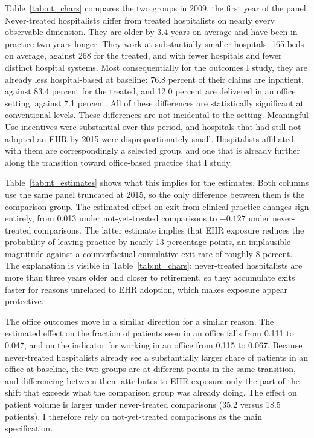 \documentclass[12pt]{article}
\begin{document}
Table~\ref{tab:nt_chars} compares the two groups in 2009, the first year of the panel. Never-treated hospitalists differ from treated hospitalists on nearly every observable dimension. They are older by 3.4 years on average and have been in practice two years longer. They work at substantially smaller hospitals: 165 beds on average, against 268 for the treated, and with fewer hospitals and fewer distinct hospital systems. Most consequentially for the outcomes I study, they are already less hospital-based at baseline: 76.8 percent of their claims are inpatient, against 83.4 percent for the treated, and 12.0 percent are delivered in an office setting, against 7.1 percent. All of these differences are statistically significant at conventional levels. These differences are not incidental to the setting. Meaningful Use incentives were substantial over this period, and hospitals that had still not adopted an
EHR by 2015 were disproportionately small. Hospitalists affiliated with them are correspondingly a selected group, and one that is already further along the transition toward office-based practice that I study.



Table~\ref{tab:nt_estimates} shows what this implies for the estimates. Both columns use the same panel truncated at 2015, so the only difference between them is the comparison group. The estimated effect on exit from clinical practice changes sign entirely, from 0.013 under not-yet-treated comparisons to $-0.127$ under never-treated comparisons. The latter estimate implies that EHR exposure reduces the probability of leaving practice by nearly 13 percentage points, an implausible magnitude against a counterfactual cumulative exit rate of roughly 8 percent. The explanation is visible in Table~\ref{tab:nt_chars}: never-treated hospitalists are more than three years older and closer to retirement, so they accumulate exits faster for reasons unrelated to EHR adoption, which makes exposure appear protective.

The office outcomes move in a similar direction for a similar reason. The
estimated effect on the fraction of patients seen in an office falls from 0.111 to 0.047, and on the indicator for working in an office from 0.115 to 0.067. Because never-treated hospitalists already see a substantially larger share of patients in an office at baseline, the two groups are at different points in the same transition, and differencing between them attributes to EHR exposure only the part of the shift that exceeds what the comparison group was already doing. The effect on patient volume is larger under never-treated comparisons (35.2 versus 18.5 patients). I therefore rely on not-yet-treated comparisons as the main specification. 
\end{document}
